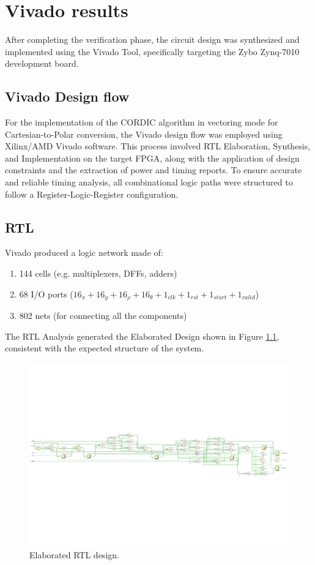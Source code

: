 \chapter{Vivado results}
After completing the verification phase, the circuit design was synthesized and implemented using the Vivado Tool, specifically targeting the Zybo Zynq-7010 development board.

\section{Vivado Design flow}
For the implementation of the CORDIC algorithm in vectoring mode for Cartesian-to-Polar conversion, the Vivado design flow was employed using Xilinx/AMD Vivado software. This process involved RTL Elaboration, Synthesis, and Implementation on the target FPGA, along with the application of design constraints and the extraction of power and timing reports. To ensure accurate and reliable timing analysis, all combinational logic paths were structured to follow a Register-Logic-Register configuration.

\section{RTL}
Vivado produced a logic network made of:

\begin{enumerate}
    \item 144 cells (e.g. multiplexers, DFFs, adders)
    \item 68 I/O ports ($16_{x} + 16_{y} + 16_{\rho} + 16_{\theta} + 1_{clk} + 1_{rst} + 1_{start} + 1_{valid}$)
    \item 802 nets (for connecting all the components)
\end{enumerate}

The RTL Analysis generated the Elaborated Design shown in Figure \ref{fig:schematic}, consistent with the expected structure of the system.

\begin{figure}[H]
    \centering
    \includegraphics[width=\textwidth, trim=0 200 0 200, clip]{./images/Vivado/rtl.pdf}
    \caption{Elaborated RTL design.}
    \label{fig:schematic}
\end{figure}

